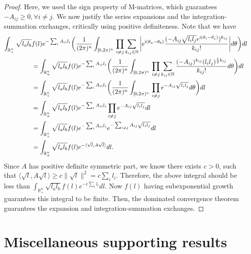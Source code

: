 \documentclass[a4paper, 11pt]{article}
\newcommand{\compi}{\textnormal{i}}
\begin{document}
\begin{proof}
Here, we used the sign property of M-matrices, which guarantees $-A_{ij}\geq 0, \forall i\neq j$. We now justify the series expansions and the integration-summation exchanges, critically using positive definiteness. Note that we have
    \begin{align*}
    \int_{\mathbb{R}_+^n}\sqrt{l_a l_b} & f(l) e^{-\sum_{i} A_{ii}l_i}\bigg(\frac{1}{(2\pi)^n}\int_{[0,2\pi)^n}\, \prod_{i\neq j}\sum_{k_{ij}\in\mathbb{N}} \bigg|e^{\compi(\theta_a-\theta_b)}\frac{(- A_{ij}\sqrt{l_i l_j}e^{\compi(\theta_i-\theta_j)})^{k_{ij}}}{k_{ij}!}\bigg| d\theta\bigg) dl\\
    &= \int_{\mathbb{R}_+^n}\sqrt{l_a l_b} f(l) e^{-\sum_{i} A_{ii}l_i}\bigg(\frac{1}{(2\pi)^n}\int_{[0,2\pi)^n}\, \prod_{i\neq j}\sum_{k_{ij}\in\mathbb{N}} \frac{(-A_{ij})^{k_{ij}}(l_i l_j)^{\frac{1}{2}k_{ij}}}{k_{ij}!} d\theta\bigg) dl\\
    &= \int_{\mathbb{R}_+^n}\sqrt{l_a l_b} f(l) e^{-\sum_{i} A_{ii}l_i}\bigg(\frac{1}{(2\pi)^n}\int_{[0,2\pi)^n}\, \prod_{i\neq j}e^{-A_{ij}\sqrt{l_i l_j}} d\theta\bigg) dl\\
    &= \int_{\mathbb{R}_+^n}\sqrt{l_a l_b} f(l) e^{-\sum_{i} A_{ii}l_i} \prod_{i\neq j}e^{-A_{ij}\sqrt{l_i l_j}} dl\\
    &= \int_{\mathbb{R}_+^n}\sqrt{l_a l_b} f(l) e^{-\sum_{i} A_{ii}l_i} e^{-\sum_{i\neq j}A_{ij}\sqrt{l_i l_j}} dl\\
    &= \int_{\mathbb{R}_+^n}\sqrt{l_a l_b} f(l) e^{-\langle \sqrt{l}, A\sqrt{l}\rangle} dl.
    \end{align*}
Since $A$ has positive definite symmetric part, we know there exists $c>0$, such that $\langle \sqrt{l}, A\sqrt{l}\rangle \geq c\|\sqrt{l}\|^2=c\sum_il_i$. Therefore, the above integral should be less than $ \int_{\mathbb{R}_+^n}\sqrt{l_a l_b} f(l) e^{-c\sum_i l_i} dl.$ Now $f(l)$ having subexponential growth guarantees this integral to be finite. Then, the dominated convergence theorem guarantees the expansion and integration-summation exchanges.
\end{proof}

\section{Miscellaneous supporting results}  \label{app:misc}
\end{document}
